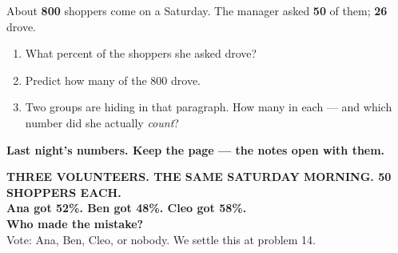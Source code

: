 \documentclass[aspectratio=169, 11pt]{beamer}
\begin{document}
\begin{frame}[t, plain]
  \vspace{0.3cm}
  \begin{center}
    \begin{minipage}{0.86\textwidth}
      About \textbf{800} shoppers come on a Saturday. The manager asked \textbf{50} of them;
      \textbf{26} drove.
      \begin{enumerate}\setlength{\itemsep}{7pt}
        \item What percent of the shoppers she asked drove?
        \item Predict how many of the 800 drove.
        \item Two groups are hiding in that paragraph. How many in each --- and which number
              did she actually \emph{count}?
      \end{enumerate}
    \end{minipage}
  \end{center}
  \vspace{0.4cm}
  \begin{center}
    {\color{cerulean}\bfseries Last night's numbers. Keep the page --- the notes open with them.}
  \end{center}
\end{frame}

{
\begin{frame}[plain]
  \vspace{1.3cm}
  \begin{center}
    {\color{frostmid}\bfseries\small THREE VOLUNTEERS. THE SAME SATURDAY MORNING. 50 SHOPPERS EACH.}\\[0.8cm]
    {\color{white}\bfseries\Large Ana got 52\%. \quad Ben got 48\%. \quad Cleo got 58\%.}\\[0.9cm]
    {\color{goldacc}\bfseries\large Who made the mistake?}\\[0.5cm]
    {\color{frostmid}\small Vote: Ana, Ben, Cleo, or nobody. We settle this at problem 14.}
  \end{center}
\end{frame}
}
\end{document}
